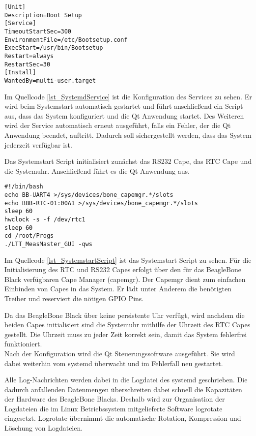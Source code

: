 \begin{lstlisting}[caption={Systemd Service},label=lst_SystemdService]
[Unit]
Description=Boot Setup
[Service]
TimeoutStartSec=300
EnvironmentFile=/etc/Bootsetup.conf
ExecStart=/usr/bin/Bootsetup
Restart=always
RestartSec=30
[Install]
WantedBy=multi-user.target
\end{lstlisting}

Im Quellcode \ref{lst_SystemdService} ist die Konfiguration des Services zu sehen. Er wird beim Systemstart automatisch gestartet und führt anschließend ein Script aus, dass das System konfiguriert und die Qt Anwendung startet. Des Weiteren wird der Service automatisch erneut ausgeführt, falls ein Fehler, der die Qt Anwendung beendet, auftritt. Dadurch soll sichergestellt werden, dass das System jederzeit verfügbar ist.\ 

Das Systemstart Script initialisiert zunächst das RS232 Cape, das \ac{RTC} Cape und die Systemuhr. Anschließend führt es die Qt Anwendung aus.\\ 

\begin{lstlisting}[caption={Systemstart Script},label=lst_SystemstartScript]
#!/bin/bash
echo BB-UART4 >/sys/devices/bone_capemgr.*/slots
echo BBB-RTC-01:00A1 >/sys/devices/bone_capemgr.*/slots
sleep 60
hwclock -s -f /dev/rtc1
sleep 60
cd /root/Progs
./LTT_MeasMaster_GUI -qws
\end{lstlisting}

Im Quellcode \ref{lst_SystemstartScript} ist das Systemstart Script zu sehen. Für die Initialisierung des RTC und RS232 Capes erfolgt über den für das BeagleBone Black verfügbaren Cape Manager (capemgr). Der Capemgr \cite{Capemgr} dient zum einfachen Einbinden von Capes in das System. Er lädt unter Anderem die benötigten Treiber und reserviert die nötigen \ac{GPIO} Pins.\ 

Da das BeagleBone Black über keine persistente Uhr verfügt, wird nachdem die beiden Capes initialisiert sind die Systemuhr mithilfe der Uhrzeit des RTC Capes gestellt. Die Uhrzeit muss zu jeder Zeit korrekt sein, damit das System fehlerfrei funktioniert.\\
Nach der Konfiguration wird die Qt Steuerungssoftware ausgeführt. Sie wird dabei weiterhin vom systemd überwacht und im Fehlerfall neu gestartet.\ 

Alle Log-Nachrichten werden dabei in die Logdatei des systemd geschrieben. Die dadurch anfallenden Datenmengen überschreiten dabei schnell die Kapazitäten der Hardware des BeagleBone Blacks. Deshalb wird zur Organisation der Logdateien die im Linux Betriebssystem mitgelieferte Software logrotate \citep{logrotate} eingesetzt. Logrotate übernimmt die automatische Rotation, Kompression und Löschung von Logdateien. 



